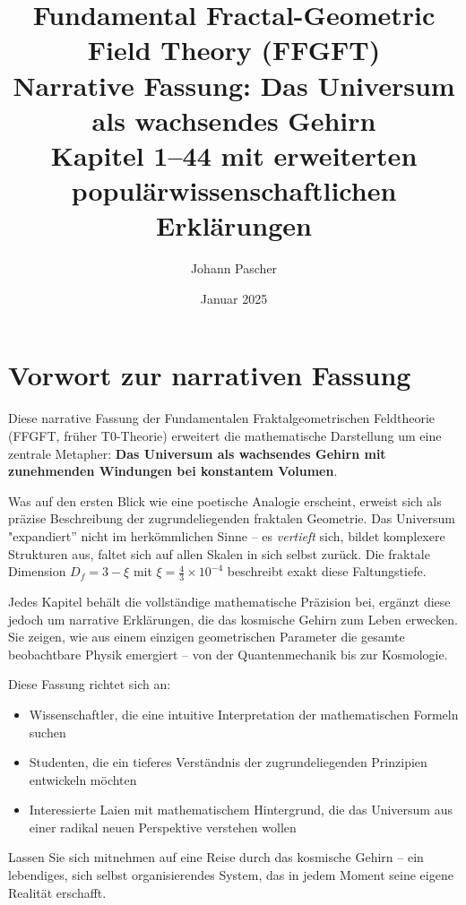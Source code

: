 \documentclass[11pt,openright,twoside]{book}
\title{%
	\textbf{Fundamental Fractal-Geometric Field Theory (FFGFT)} \\
	\Large Narrative Fassung: Das Universum als wachsendes Gehirn \\
	\normalsize Kapitel 1--44 mit erweiterten populärwissenschaftlichen Erklärungen
}
\author{Johann Pascher}
\date{Januar 2025}
\begin{document}
\maketitle

\tableofcontents



\chapter*{Vorwort zur narrativen Fassung}

Diese narrative Fassung der Fundamentalen Fraktalgeometrischen Feldtheorie (FFGFT, früher T0-Theorie) erweitert die mathematische Darstellung um eine zentrale Metapher: \textbf{Das Universum als wachsendes Gehirn mit zunehmenden Windungen bei konstantem Volumen}.

Was auf den ersten Blick wie eine poetische Analogie erscheint, erweist sich als präzise Beschreibung der zugrundeliegenden fraktalen Geometrie. Das Universum "expandiert'' nicht im herkömmlichen Sinne – es \textit{vertieft} sich, bildet komplexere Strukturen aus, faltet sich auf allen Skalen in sich selbst zurück. Die fraktale Dimension $D_f = 3 - \xi$ mit $\xi = \frac{4}{3} \times 10^{-4}$ beschreibt exakt diese Faltungstiefe.

Jedes Kapitel behält die vollständige mathematische Präzision bei, ergänzt diese jedoch um narrative Erklärungen, die das kosmische Gehirn zum Leben erwecken. Sie zeigen, wie aus einem einzigen geometrischen Parameter die gesamte beobachtbare Physik emergiert – von der Quantenmechanik bis zur Kosmologie.

Diese Fassung richtet sich an:
\begin{itemize}
	\item Wissenschaftler, die eine intuitive Interpretation der mathematischen Formeln suchen
	\item Studenten, die ein tieferes Verständnis der zugrundeliegenden Prinzipien entwickeln möchten
	\item Interessierte Laien mit mathematischem Hintergrund, die das Universum aus einer radikal neuen Perspektive verstehen wollen
\end{itemize}

Lassen Sie sich mitnehmen auf eine Reise durch das kosmische Gehirn – ein lebendiges, sich selbst organisierendes System, das in jedem Moment seine eigene Realität erschafft.
\end{document}
